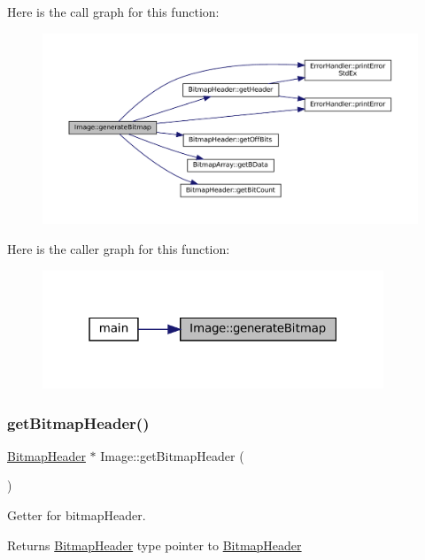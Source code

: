 Here is the call graph for this function\+:
\nopagebreak
\begin{figure}[H]
\begin{center}
\leavevmode
\includegraphics[width=350pt]{classImage_a3ca1ae6c1eb2846bfba066b01e6020e1_cgraph}
\end{center}
\end{figure}
Here is the caller graph for this function\+:
\nopagebreak
\begin{figure}[H]
\begin{center}
\leavevmode
\includegraphics[width=289pt]{classImage_a3ca1ae6c1eb2846bfba066b01e6020e1_icgraph}
\end{center}
\end{figure}
\mbox{\label{classImage_a8c824ffac0c866a94752a2c1047932af}} 
\subsubsection{\texorpdfstring{getBitmapHeader()}{getBitmapHeader()}}
{\footnotesize\ttfamily \mbox{\hyperlink{classBitmapHeader}{Bitmap\+Header}} $\ast$ Image\+::get\+Bitmap\+Header (\begin{DoxyParamCaption}{ }\end{DoxyParamCaption})}



Getter for bitmap\+Header. 

\begin{DoxyReturn}{Returns}
\mbox{\hyperlink{classBitmapHeader}{Bitmap\+Header}} type pointer to \mbox{\hyperlink{classBitmapHeader}{Bitmap\+Header}} 
\end{DoxyReturn}


